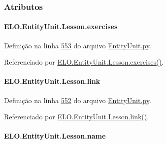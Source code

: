 \subsubsection{Atributos}
\hypertarget{classELO_1_1EntityUnit_1_1Lesson_a8d3db8bfbcfd47e9f7eef8f3bdc0ee3f}{
\paragraph[{exercises}]{\setlength{\rightskip}{0pt plus 5cm}E\-L\-O.\-Entity\-Unit.\-Lesson.\-exercises}}\label{classELO_1_1EntityUnit_1_1Lesson_a8d3db8bfbcfd47e9f7eef8f3bdc0ee3f}


Definição na linha \hyperlink{EntityUnit_8py_source_l00553}{553} do arquivo \hyperlink{EntityUnit_8py_source}{Entity\-Unit.\-py}.



Referenciado por \hyperlink{classELO_1_1EntityUnit_1_1Lesson_a49ad3f9952188497a01afdd31db8000c}{E\-L\-O.\-Entity\-Unit.\-Lesson.\-exercises()}.

\hypertarget{classELO_1_1EntityUnit_1_1Lesson_a5288d46b77e4b0cfd382857ef1b82fba}{
\paragraph[{link}]{\setlength{\rightskip}{0pt plus 5cm}E\-L\-O.\-Entity\-Unit.\-Lesson.\-link}}\label{classELO_1_1EntityUnit_1_1Lesson_a5288d46b77e4b0cfd382857ef1b82fba}


Definição na linha \hyperlink{EntityUnit_8py_source_l00552}{552} do arquivo \hyperlink{EntityUnit_8py_source}{Entity\-Unit.\-py}.



Referenciado por \hyperlink{classELO_1_1EntityUnit_1_1Lesson_a8560623b79e4379c2ba74aaf678a4764}{E\-L\-O.\-Entity\-Unit.\-Lesson.\-link()}.

\hypertarget{classELO_1_1EntityUnit_1_1Lesson_a1ca164978817a007dbec8193caae96ff}{
\paragraph[{name}]{\setlength{\rightskip}{0pt plus 5cm}E\-L\-O.\-Entity\-Unit.\-Lesson.\-name}}\label{classELO_1_1EntityUnit_1_1Lesson_a1ca164978817a007dbec8193caae96ff}


